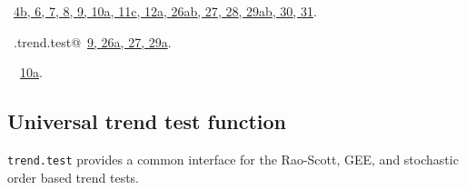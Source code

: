 \documentclass[reqno]{amsart}
\renewcommand{\NWlink}[2]{\hyperlink{#1}{#2}}
\begin{document}
\begin{flushleft}
\vspace{-1.5ex}
\footnotesize
\begin{list}{}{\setlength{\itemsep}{-\parsep}\setlength{\itemindent}{-\leftmargin}}
\item \NWtxtFileDefBy\ \NWlink{nuweb4b}{4b}\NWlink{nuweb6}{, 6}\NWlink{nuweb7}{, 7}\NWlink{nuweb8}{, 8}\NWlink{nuweb9}{, 9}\NWlink{nuweb10a}{, 10a}\NWlink{nuweb11c}{, 11c}\NWlink{nuweb12a}{, 12a}\NWlink{nuweb26a}{, 26a}\NWlink{nuweb26b}{b}\NWlink{nuweb27}{, 27}\NWlink{nuweb28}{, 28}\NWlink{nuweb29a}{, 29a}\NWlink{nuweb29b}{b}\NWlink{nuweb30}{, 30}\NWlink{nuweb31}{, 31}.
\item \NWtxtIdentsDefed\nobreak\  \verb@SO.trend.test@\nobreak\ \NWlink{nuweb9}{9}\NWlink{nuweb26a}{, 26a}\NWlink{nuweb27}{, 27}\NWlink{nuweb29a}{, 29a}.\item \NWtxtIdentsUsed\nobreak\  \verb@soControl@\nobreak\ \NWlink{nuweb10a}{10a}.
\item{}
\end{list}
\vspace{4ex}
\end{flushleft}
\subsection{Universal trend test function}
\texttt{trend.test} provides a common interface for the Rao-Scott, GEE, and stochastic
order based trend tests.
\end{document}

